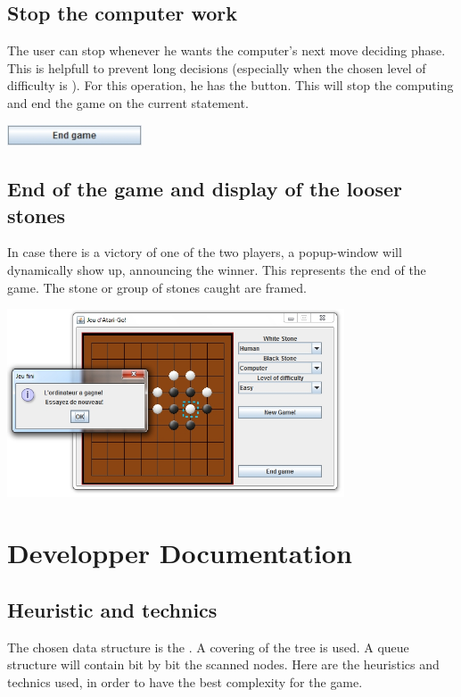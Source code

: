 \documentclass[a4paper,10pt]{report}
\newcommand{\empha}[1]{\textbf{\color{blue}{#1}}}
\begin{document}
		\section{Stop the computer work}
		The user can stop whenever he wants the computer's next move deciding phase. This is helpfull to prevent long decisions (especially when the chosen level of difficulty is \empha{Hard}). For this operation, he has the \empha{End game} button. This will stop the computing and end the game on the current statement.
			\\
			\begin{center}
				\includegraphics[width=0.30\textwidth] {img/EndGame.jpg}
			\end{center}

		\section{End of the game and display of the looser stones}
		In case there is a victory of one of the two players, a popup-window will dynamically show up, announcing the winner. This represents the end of the game. The stone or group of stones caught are framed.
			\\
			\begin{center}
				\includegraphics[width=0.75\textwidth] {img/End.jpg}
			\end{center}




	\chapter*{Developper Documentation}
		\section{Heuristic and technics}
		The chosen data structure is the \empha{Adjacency list}. A \empha{Breadth First Search} covering of the \empha{Min-Max} tree is used. A queue structure will contain bit by bit the scanned nodes. Here are the heuristics and technics used, in order to have the best complexity for the \empha{Atari-Go} game.
\end{document}
